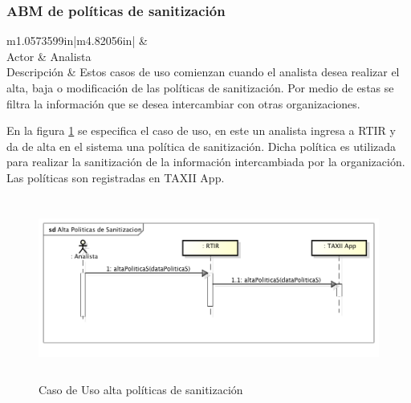 \subsubsection{ABM de políticas de sanitización}
\begin{flushleft}
	\tablefirsthead{}
	\tablehead{}
	\tabletail{}
	\tablelasttail{}
	\begin{supertabular}{m{1.0573599in}|m{4.82056in}|}
		 &
		\\\hline
		{Actor} &
		{Analista}\\
		{Descripción} &
		{Estos casos de uso comienzan cuando el analista desea realizar el alta, baja o
			modificación de las políticas de sanitización. Por medio de estas se filtra la información que se desea intercambiar
			con otras organizaciones.}\\\hhline{~-}
	\end{supertabular}
\end{flushleft}

\bigskip

{
	\bigskip
	En la figura \ref{fig.altasanitizacion} se especifica el caso de uso, en este un analista ingresa a RTIR y da de alta en el sistema una política
	de sanitización. Dicha política es utilizada para realizar la sanitización de la información intercambiada por la
	organización. Las políticas son registradas en TAXII App.}
\bigskip
\begin{figure}[ht!]
	\centering
	\includegraphics[width=5.7638in,height=2.3575in]{Analisis22-img/Analisis22-img017.png} 
	\caption{Caso de Uso alta políticas de sanitización}
	\label{fig.altasanitizacion}
\end{figure}

